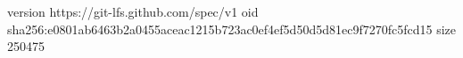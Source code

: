 version https://git-lfs.github.com/spec/v1
oid sha256:e0801ab6463b2a0455aceac1215b723ac0ef4ef5d50d5d81ec9f7270fc5fcd15
size 250475
